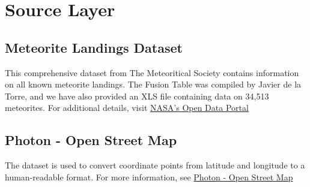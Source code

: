 \documentclass[conference]{IEEEtran}
\begin{document}
	\section{Source Layer}
	
	\subsection{Meteorite Landings Dataset}
	\label{subsec:meteorite landings data set}
	This comprehensive dataset from The Meteoritical Society contains information on all known meteorite landings. The Fusion Table was compiled by Javier de la Torre, and we have also provided an XLS file containing data on 34,513 meteorites. For additional details, visit \href{https://data.nasa.gov/Space-Science/Meteorite-Landings/gh4g-9sfh/about_data}{NASA's Open Data Portal}
		
	\subsection{Photon - Open Street Map}
	\label{subsec:open_street_map}
	The dataset is used to convert coordinate points from latitude and longitude to a human-readable format. For more information, see 
	\href{https://photon.komoot.io/}{Photon - Open Street Map}
				
\end{document}
